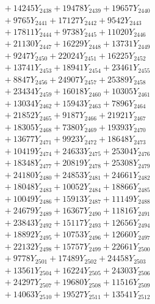 \documentclass[a4paper,10pt]{article}
\begin{document}
{\begin{align}
&\;  + 14245 Y_{2438} + 19478 Y_{2439} + 19657 Y_{2440} \\[0.3ex]
&\;  + 9765 Y_{2441} + 17127 Y_{2442} + 9542 Y_{2443} \\[0.3ex]
&\;  + 17811 Y_{2444} + 9738 Y_{2445} + 11020 Y_{2446} \\[0.3ex]
&\;  + 21130 Y_{2447} + 16229 Y_{2448} + 13731 Y_{2449} \\[0.3ex]
&\;  + 9247 Y_{2450} + 22024 Y_{2451} + 16225 Y_{2452} \\[0.3ex]
&\;  + 13741 Y_{2453} + 18941 Y_{2454} + 23461 Y_{2455} \\[0.3ex]
&\;  + 8847 Y_{2456} + 24907 Y_{2457} + 25389 Y_{2458} \\[0.5ex]\allowbreak
&\;  + 23434 Y_{2459} + 16018 Y_{2460} + 10305 Y_{2461} \\[0.3ex]
&\;  + 13034 Y_{2462} + 15943 Y_{2463} + 7896 Y_{2464} \\[0.3ex]
&\;  + 21852 Y_{2465} + 9187 Y_{2466} + 21921 Y_{2467} \\[0.3ex]
&\;  + 18305 Y_{2468} + 7380 Y_{2469} + 19393 Y_{2470} \\[0.3ex]
&\;  + 13677 Y_{2471} + 9923 Y_{2472} + 18648 Y_{2473} \\[0.3ex]
&\;  + 10419 Y_{2474} + 24633 Y_{2475} + 25304 Y_{2476} \\[0.3ex]
&\;  + 18348 Y_{2477} + 20819 Y_{2478} + 25308 Y_{2479} \\[0.3ex]
&\;  + 24180 Y_{2480} + 24853 Y_{2481} + 24661 Y_{2482} \\[0.3ex]
&\;  + 18048 Y_{2483} + 10052 Y_{2484} + 18866 Y_{2485} \\[0.3ex]
&\;  + 10049 Y_{2486} + 15913 Y_{2487} + 11149 Y_{2488} \\[0.5ex]\allowbreak
&\;  + 24679 Y_{2489} + 16367 Y_{2490} + 11816 Y_{2491} \\[0.3ex]
&\;  + 23843 Y_{2492} + 15117 Y_{2493} + 12656 Y_{2494} \\[0.3ex]
&\;  + 18892 Y_{2495} + 10753 Y_{2496} + 12660 Y_{2497} \\[0.3ex]
&\;  + 22132 Y_{2498} + 15757 Y_{2499} + 22661 Y_{2500} \\[0.3ex]
&\;  + 9778 Y_{2501} + 17489 Y_{2502} + 24458 Y_{2503} \\[0.3ex]
&\;  + 13561 Y_{2504} + 16224 Y_{2505} + 24303 Y_{2506} \\[0.3ex]
&\;  + 24297 Y_{2507} + 19680 Y_{2508} + 11516 Y_{2509} \\[0.3ex]
&\;  + 14063 Y_{2510} + 19527 Y_{2511} + 13541 Y_{2512} \\[0.3ex]

\end{align}}
\end{document}
